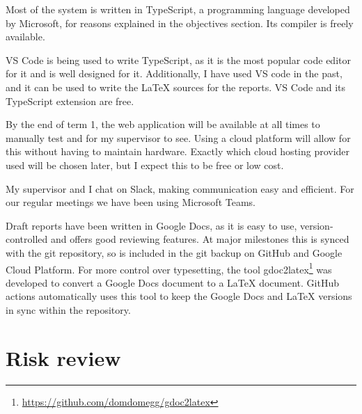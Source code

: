 \documentclass[a4paper,fleqn,12pt]{article}
\begin{document}
Most of the system is written in TypeScript, a programming language developed by Microsoft, for reasons explained in the objectives section. Its compiler is freely available.

VS Code is being used to write TypeScript, as it is the most popular code editor for it and is well designed for it. Additionally, I have used VS code in the past, and it can be used to write the LaTeX sources for the reports. VS Code and its TypeScript extension are free.

By the end of term 1, the web application will be available at all times to manually test and for my supervisor to see. Using a cloud platform will allow for this without having to maintain hardware. Exactly which cloud hosting provider used will be chosen later, but I expect this to be free or low cost.

My supervisor and I chat on Slack, making communication easy and efficient. For our regular meetings we have been using Microsoft Teams.

Draft reports have been written in Google Docs, as it is easy to use, version-controlled and offers good reviewing features. At major milestones this is synced with the git repository, so is included in the git backup on GitHub and Google Cloud Platform. For more control over typesetting, the tool gdoc2latex\footnote{\href{https://github.com/domdomegg/gdoc2latex}{https://github.com/domdomegg/gdoc2latex}} was developed to convert a Google Docs document to a LaTeX document. GitHub actions automatically uses this tool to keep the Google Docs and LaTeX versions in sync within the repository.

\section{Risk review}\label{id:h.lkcg9956g3l}
\end{document}

